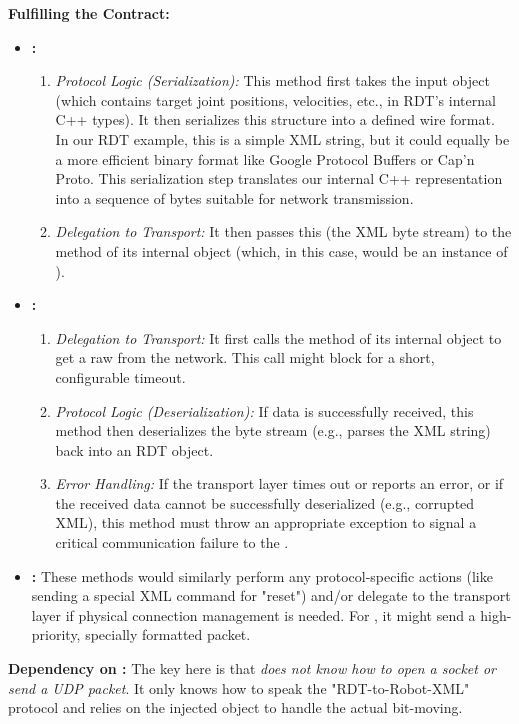     \textbf{Fulfilling the  Contract:}
        \begin{itemize}
            \item \textbf{:}
                \begin{enumerate}
                    \item \textit{Protocol Logic (Serialization):} This method first takes the input  object (which contains target joint positions, velocities, etc., in RDT's internal C++ types). It then serializes this structure into a defined wire format. In our RDT example, this is a simple XML string, but it could equally be a more efficient binary format like Google Protocol Buffers or Cap'n Proto. This serialization step translates our internal C++ representation into a sequence of bytes suitable for network transmission.
                    \item \textit{Delegation to Transport:} It then passes this  (the XML byte stream) to the  method of its internal  object (which, in this case, would be an instance of ).
                \end{enumerate}
            \item \textbf{:}
                \begin{enumerate}
                    \item \textit{Delegation to Transport:} It first calls the  method of its internal  object to get a raw  from the network. This call might block for a short, configurable timeout.
                    \item \textit{Protocol Logic (Deserialization):} If data is successfully received, this method then deserializes the byte stream (e.g., parses the XML string) back into an RDT  object.
                    \item \textit{Error Handling:} If the transport layer times out or reports an error, or if the received data cannot be successfully deserialized (e.g., corrupted XML), this method must throw an appropriate exception to signal a critical communication failure to the .
                \end{enumerate}
            \item \textbf{:} These methods would similarly perform any protocol-specific actions (like sending a special XML command for "reset") and/or delegate to the transport layer if physical connection management is needed. For , it might send a high-priority, specially formatted packet.
        \end{itemize}
    \textbf{Dependency on :} The key here is that  \textit{does not know how to open a socket or send a UDP packet}. It only knows how to speak the "RDT-to-Robot-XML" protocol and relies on the injected  object to handle the actual bit-moving.


